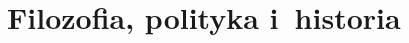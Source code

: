 \documentclass[a4paper,11pt]{article}
\begin{document}





























\newpage
\section{Filozofia, polityka i~historia}
\end{document}
